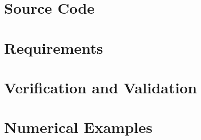 \documentclass{simcenterdocumentation}
\begin{document}
\chapter{Source Code}



\chapter{Requirements}


\chapter{Verification and Validation}


\chapter{Numerical Examples}



\pagestyle{plain}
{
  \renewcommand{\thispagestyle}[1]{}
  \printbibliography           
}
\end{document}
